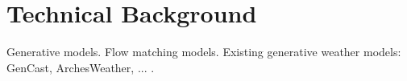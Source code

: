 \chapter{Technical Background}

Generative models.
Flow matching models.
Existing generative weather models: GenCast, ArchesWeather, ... .

